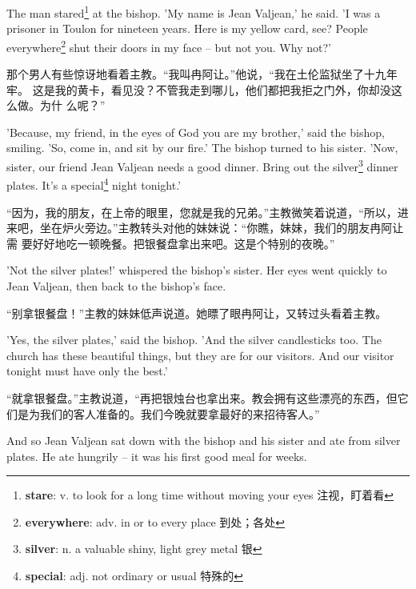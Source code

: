 \documentclass[fontset=ubuntu, zihao=5]{ctexart}
\begin{document}
\begin{paracol}{2}
  \switchcolumn*

  The man stared\footnote{\textbf{stare}: v. to look for a long time without moving your eyes 注视，盯着看} at the bishop. 'My name is Jean Valjean,' he said. 'I was a prisoner in Toulon for nineteen years. Here is my yellow card, see? People everywhere\footnote{\textbf{everywhere}: adv. in or to every place 到处；各处} shut their doors in my face – but not you. Why not?'

\switchcolumn

那个男人有些惊讶地看着主教。“我叫冉阿让。”他说，“我在土伦监狱坐了十九年牢。
这是我的黄卡，看见没？不管我走到哪儿，他们都把我拒之门外，你却没这么做。为什
么呢？”

\switchcolumn*

'Because, my friend, in the eyes of God you are my brother,' said the
bishop, smiling. 'So, come in, and sit by our fire.' The bishop turned to
his sister. 'Now, sister, our friend Jean Valjean needs a good dinner. Bring
out the silver\footnote{\textbf{silver}: n. a valuable shiny, light grey
  metal 银} dinner plates. It's a special\footnote{\textbf{special}: adj. not ordinary or usual 特殊的} night tonight.'

\switchcolumn

“因为，我的朋友，在上帝的眼里，您就是我的兄弟。”主教微笑着说道，“所以，进
来吧，坐在炉火旁边。”主教转头对他的妹妹说：“你瞧，妹妹，我们的朋友冉阿让需
要好好地吃一顿晚餐。把银餐盘拿出来吧。这是个特别的夜晚。”

\switchcolumn*

  'Not the silver plates!' whispered the bishop's sister. Her eyes went quickly to Jean Valjean, then back to the bishop's face.

\switchcolumn

  “别拿银餐盘！”主教的妹妹低声说道。她瞟了眼冉阿让，又转过头看着主教。

\switchcolumn*

  'Yes, the silver plates,' said the bishop. 'And the silver candlesticks too. The church has these beautiful things, but they are for our visitors. And our visitor tonight must have only the best.'

  \switchcolumn
  “就拿银餐盘。”主教说道，“再把银烛台也拿出来。教会拥有这些漂亮的东西，但它们是为我们的客人准备的。我们今晚就要拿最好的来招待客人。”

\switchcolumn*

  And so Jean Valjean sat down with the bishop and his sister and ate from silver plates. He ate hungrily – it was his first good meal for weeks.


\end{paracol}
\end{document}
